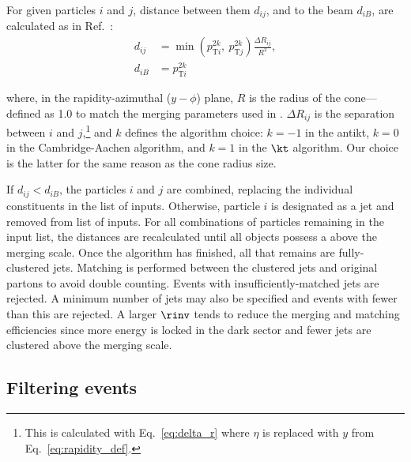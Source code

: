 For given particles $i$ and $j$, distance between them $d_{ij}$, and to the beam $d_{iB}$, are calculated as in Ref.~:
\begin{equation}
    \begin{aligned}
d_{ij} &= \min(p_{\mathrm{T}i}^{2k}, \ p_{\mathrm{T}j}^{2k}) \frac{\Delta R_{ij}}{R^2},\\
d_{iB} &= p_{\mathrm{T}i}^{2k}
    \end{aligned}
    \label{eq:distances_kt_pythia}
\end{equation}

where, in the rapidity-azimuthal ($y-\phi$) plane, $R$ is the radius of the cone---defined as 1.0 to match the merging parameters used in \MADGRAPH. $\Delta R_{ij}$ is the separation between $i$ and $j$,\footnote{This is calculated with Eq.~\ref{eq:delta_r} where $\eta$ is replaced with $y$ from Eq.~\ref{eq:rapidity_def}.} and $k$ defines the algorithm choice: $k = -\text{1}$ in the \gls{antikt}, $k = \text{0}$ in the Cambridge-Aachen algorithm, and $k = \text{1}$ in the $\kt$ algorithm. Our choice is the latter for the same reason as the cone radius size.

If $d_{ij} < d_{iB}$, the particles $i$ and $j$ are combined, replacing the individual constituents in the list of inputs. Otherwise, particle $i$ is designated as a jet and removed from list of inputs. For all combinations of particles remaining in the input list, the distances are recalculated until all objects possess a \pt above the merging scale. Once the algorithm has finished, all that remains are fully-clustered \glspl{jet}. Matching is performed between the clustered \glspl{jet} and original partons to avoid double counting. Events with insufficiently-matched \glspl{jet} are rejected. A minimum number of \glspl{jet} may also be specified and events with fewer than this are rejected. A larger $\rinv$ tends to reduce the merging and matching efficiencies since more energy is locked in the dark sector and fewer \glspl{jet} are clustered above the merging scale.





\subsection{Filtering events}
\label{subsec:svj_pythia_filters}

